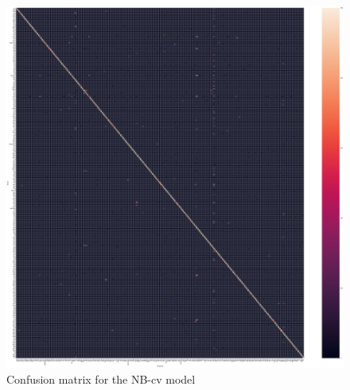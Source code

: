 \documentclass[conference]{IEEEtran}
\begin{document}
\label{appendix}
\begin{figure}[h]
  \centering
      \includegraphics[width=\textwidth]{conf_mat_cv}
		\caption{Confusion matrix for the NB-cv model}
		\label{fig:conf_mat_cv}      
\end{figure}

\end{document}
